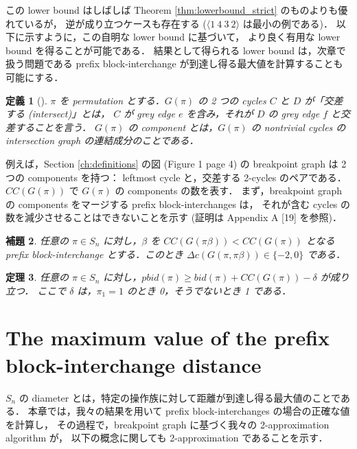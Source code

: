 \documentclass[paper=a4,fontsize=11pt,report,oneside]{jlreq}
\newtheorem{theorem}{定理}[chapter]
\newtheorem{lemma}[theorem]{補題}
\newtheorem{definition}[theorem]{定義}
\begin{document}
この lower bound はしばしば Theorem \ref{thm:lowerbound_strict} のものよりも優れているが，
逆が成り立つケースも存在する ($\langle 1\ 4\ 3\ 2 \rangle$ は最小の例である)．
以下に示すように，この自明な lower bound に基づいて，
より良く有用な lower bound を得ることが可能である．
結果として得られる lower bound は，次章で扱う問題である prefix block-interchange が到達し得る最大値を計算することも可能にする．

\begin{definition}[\cite{lin2005polynomial}] \label{def:components}
    $\pi$ を permutation とする．$G(\pi)$ の 2 つの cycles $C$ と $D$ が「交差する (intersect)」とは，
    $C$ が grey edge $e$ を含み，それが $D$ の grey edge $f$ と交差することを言う．
    $G(\pi)$ の component とは，$G(\pi)$ の nontrivial cycles の intersection graph の連結成分のことである．
\end{definition}

例えば，Section \ref{ch:definitions} の図 (Figure 1 page 4) の breakpoint graph は 2 つの components を持つ：
leftmost cycle と，交差する 2-cycles のペアである．
$CC(G(\pi))$ で $G(\pi)$ の components の数を表す．
まず，breakpoint graph の components をマージする prefix block-interchanges は，
それが含む cycles の数を減少させることはできないことを示す (証明は Appendix A [19] を参照)．

\begin{lemma} \label{lem:merge_components}
    任意の $\pi \in S_n$ に対し，$\beta$ を $CC(G(\pi\beta)) < CC(G(\pi))$ となる
    prefix block-interchange とする．このとき $\Delta c(G(\pi, \pi\beta)) \in \{-2, 0\}$ である．
\end{lemma}

\begin{theorem} \label{thm:improved_lowerbound}
    任意の $\pi \in S_n$ に対し，$pbid(\pi) \ge bid(\pi) + CC(G(\pi)) - \delta$ が成り立つ．
    ここで $\delta$ は，$\pi_1 = 1$ のとき 0，そうでないとき 1 である．
\end{theorem}


\chapter{The maximum value of the prefix block-interchange distance}

$S_n$ の diameter とは，特定の操作族に対して距離が到達し得る最大値のことである．
本章では，我々の結果を用いて prefix block-interchanges の場合の正確な値を計算し，
その過程で，breakpoint graph に基づく我々の 2-approximation algorithm が，
以下の概念に関しても 2-approximation であることを示す．
\end{document}
